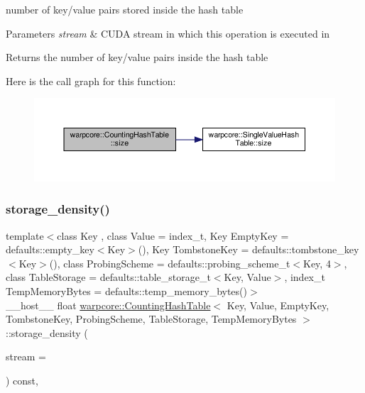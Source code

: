 number of key/value pairs stored inside the hash table 


\begin{DoxyParams}{Parameters}
{\em stream} & C\+U\+DA stream in which this operation is executed in \\
\hline
\end{DoxyParams}
\begin{DoxyReturn}{Returns}
the number of key/value pairs inside the hash table 
\end{DoxyReturn}
Here is the call graph for this function\+:
\nopagebreak
\begin{figure}[H]
\begin{center}
\leavevmode
\includegraphics[width=350pt]{classwarpcore_1_1CountingHashTable_aa331f755c38f5b073ed7e58e3ad59777_cgraph}
\end{center}
\end{figure}
\mbox{\label{classwarpcore_1_1CountingHashTable_aa7b5b49d50edc280ce007cf92abdc4ae}} 
\subsubsection{\texorpdfstring{storage\+\_\+density()}{storage\_density()}}
{\footnotesize\ttfamily template$<$class Key , class Value  = index\+\_\+t, Key Empty\+Key = defaults\+::empty\+\_\+key$<$\+Key$>$(), Key Tombstone\+Key = defaults\+::tombstone\+\_\+key$<$\+Key$>$(), class Probing\+Scheme  = defaults\+::probing\+\_\+scheme\+\_\+t$<$\+Key, 4$>$, class Table\+Storage  = defaults\+::table\+\_\+storage\+\_\+t$<$\+Key, Value$>$, index\+\_\+t Temp\+Memory\+Bytes = defaults\+::temp\+\_\+memory\+\_\+bytes()$>$ \\
\+\_\+\+\_\+host\+\_\+\+\_\+ float \hyperlink{classwarpcore_1_1CountingHashTable}{warpcore\+::\+Counting\+Hash\+Table}$<$ Key, Value, Empty\+Key, Tombstone\+Key, Probing\+Scheme, Table\+Storage, Temp\+Memory\+Bytes $>$\+::storage\+\_\+density (\begin{DoxyParamCaption}\item[{cuda\+Stream\+\_\+t}]{stream = {} }\end{DoxyParamCaption}) const\hspace{0.3cm}{\ttfamily [inline]}, {\ttfamily [noexcept]}}



